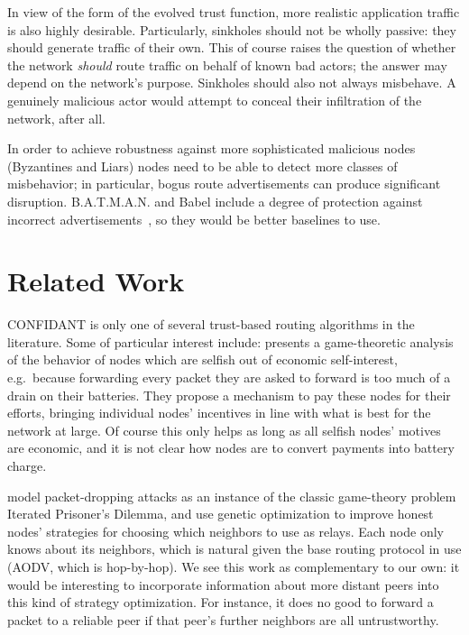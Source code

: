 \documentclass{article}
\begin{document}
In view of the form of the evolved trust function, more realistic
application traffic is also highly desirable.  Particularly, sinkholes
should not be wholly passive: they should generate traffic of their
own.  This of course raises the question of whether the network
\emph{should} route traffic on behalf of known bad actors; the answer
may depend on the network's purpose.  Sinkholes should also not always
misbehave.  A genuinely malicious actor would attempt to conceal their
infiltration of the network, after all.

In order to achieve robustness against more sophisticated malicious
nodes (Byzantines and Liars) nodes need to be able to detect more
classes of misbehavior; in particular, bogus route advertisements can
produce significant disruption.  B.A.T.M.A.N. and Babel include a
degree of protection against incorrect
advertisements~\cite{abolhasan2009}, so they would be better baselines
to use.

\section{Related Work}

CONFIDANT is only one of several trust-based routing algorithms in the
literature.  Some of particular interest include:
\textcite{anderegg2003} presents a game-theoretic analysis of the
behavior of nodes which are selfish out of economic self-interest,
e.g.\ because forwarding every packet they are asked to forward is too
much of a drain on their batteries.  They propose a mechanism to pay
these nodes for their efforts, bringing individual nodes' incentives
in line with what is best for the network at large. Of course this
only helps as long as all selfish nodes' motives are economic, and it
is not clear how nodes are to convert payments into battery charge.

\textcite{komathy2008} model packet-dropping attacks as an instance of
the classic game-theory problem Iterated Prisoner's Dilemma, and use
genetic optimization to improve honest nodes' strategies for choosing
which neighbors to use as relays.  Each node only knows about its
neighbors, which is natural given the base routing protocol in use
(AODV, which is hop-by-hop).  We see this work as complementary to our
own: it would be interesting to incorporate information about more
distant peers into this kind of strategy optimization.  For instance,
it does no good to forward a packet to a reliable peer if that peer's
further neighbors are all untrustworthy.
\end{document}
